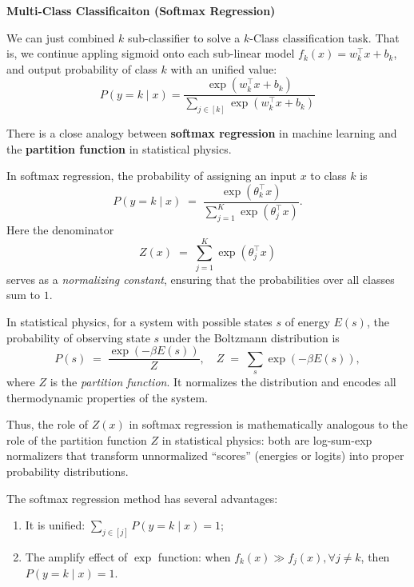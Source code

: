 \documentclass[../main]{subfiles}
\begin{document}
\begin{example}
  \textbf{Multi-Class Classificaiton (Softmax Regression)}
\end{example}
We can just combined $k$ sub-classifier to solve a $k$-Class classification task. That is, we continue appling sigmoid onto each sub-linear model $f_k(x)=w^\top_kx+b_k$, and output probability of class $k$ with an unified value:
\begin{equation}
    P(y=k\mid x)=\frac{\exp(w^\top_kx+b_k)}{\sum_{j\in[k]}\exp(w^\top_kx+b_k)}
\end{equation}
\begin{note}
  There is a close analogy between \textbf{softmax regression} in machine learning and the \textbf{partition function} in statistical physics.

  In softmax regression, the probability of assigning an input $x$ to class $k$ is
  \begin{equation}
    P(y=k \mid x) \;=\; \frac{\exp(\theta_k^\top x)}{\sum_{j=1}^K \exp(\theta_j^\top x)} .
  \end{equation}
  Here the denominator
  \begin{equation}
    Z(x) \;=\; \sum_{j=1}^K \exp(\theta_j^\top x)
  \end{equation}
  serves as a \emph{normalizing constant}, ensuring that the probabilities over all classes sum to $1$.

  In statistical physics, for a system with possible states $s$ of energy $E(s)$, the probability of observing state $s$ under the Boltzmann distribution is
  \begin{equation}
    P(s) \;=\; \frac{\exp(-\beta E(s))}{Z}, 
    \quad Z \;=\; \sum_{s} \exp(-\beta E(s)) ,
  \end{equation}
  where $Z$ is the \emph{partition function}. It normalizes the distribution and encodes all thermodynamic properties of the system.

  Thus, the role of $Z(x)$ in softmax regression is mathematically analogous to the role of the partition function $Z$ in statistical physics: both are log-sum-exp normalizers that transform unnormalized ``scores'' (energies or logits) into proper probability distributions.
\end{note}
The softmax regression method has several advantages:
\begin{enumerate}
  \item It is unified: $\sum_{j\in[j]}P(y=k\mid x)=1$;
  \item The amplify effect of $\exp$ function: when $f_k(x)\gg f_j(x),\forall j\neq k$, then $P(y=k\mid x)=1$.
\end{enumerate}
\end{document}
